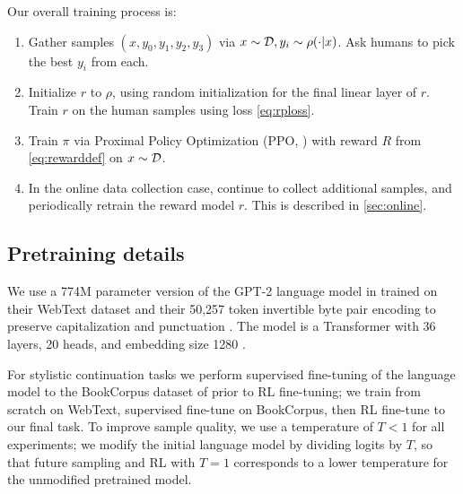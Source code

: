 \documentclass{article}
\begin{document}
Our overall training process is:
\begin{enumerate}
\item Gather samples $(x,y_0,y_1,y_2,y_3)$ via $x \sim \mathcal{D}, y_i \sim \rho(\cdot | x)$.  Ask humans to pick the best $y_i$ from each.
\item Initialize $r$ to $\rho$, using random initialization for the final linear layer of $r$.  Train $r$ on the human samples using loss \cref{eq:rploss}.
\item Train $\pi$ via Proximal Policy Optimization (PPO, \citet{schulman2017proximal}) with reward $R$ from \cref{eq:rewarddef}
on $x \sim \mathcal{D}$.
\item In the online data collection case, continue to collect additional samples, and periodically retrain the reward model $r$.
This is described in \cref{sec:online}.
\end{enumerate}

\subsection{Pretraining details \label{sec:pretrain}}


We use a 774M parameter version of the GPT-2 language model in \citet{radford2019language} trained on their WebText dataset and their 50,257 token invertible byte pair encoding to preserve capitalization and punctuation \citep{sennrich2015neural}.  The model is a Transformer with 36 layers, 20 heads, and embedding size 1280 \citep{vaswani2017attention}. 

For stylistic continuation tasks we perform supervised fine-tuning of the language model to the BookCorpus dataset of \citet{zhu2015aligning} prior to RL fine-tuning; we train from scratch on WebText, supervised fine-tune on BookCorpus, then RL fine-tune to our final task.  To improve sample quality, we use a temperature of $T < 1$ for all experiments; we modify the initial language model by dividing logits by $T$, so that future sampling and RL with $T = 1$ corresponds to a lower temperature for the unmodified pretrained model.
\end{document}
